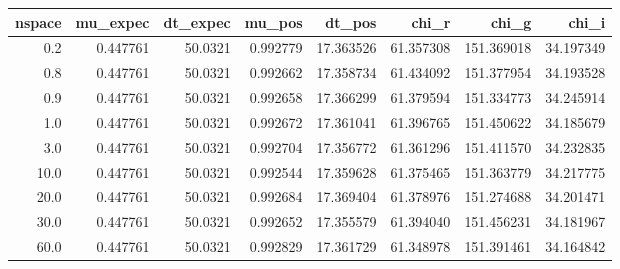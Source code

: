 \begin{tabular}{rrrrrrrr}
\toprule
 nspace &  mu\_expec &  dt\_expec &    mu\_pos &     dt\_pos &      chi\_r &       chi\_g &      chi\_i \\
\midrule
    0.2 &  0.447761 &   50.0321 &  0.992779 &  17.363526 &  61.357308 &  151.369018 &  34.197349 \\
    0.8 &  0.447761 &   50.0321 &  0.992662 &  17.358734 &  61.434092 &  151.377954 &  34.193528 \\
    0.9 &  0.447761 &   50.0321 &  0.992658 &  17.366299 &  61.379594 &  151.334773 &  34.245914 \\
    1.0 &  0.447761 &   50.0321 &  0.992672 &  17.361041 &  61.396765 &  151.450622 &  34.185679 \\
    3.0 &  0.447761 &   50.0321 &  0.992704 &  17.356772 &  61.361296 &  151.411570 &  34.232835 \\
   10.0 &  0.447761 &   50.0321 &  0.992544 &  17.359628 &  61.375465 &  151.363779 &  34.217775 \\
   20.0 &  0.447761 &   50.0321 &  0.992684 &  17.369404 &  61.378976 &  151.274688 &  34.201471 \\
   30.0 &  0.447761 &   50.0321 &  0.992652 &  17.355579 &  61.394040 &  151.456231 &  34.181967 \\
   60.0 &  0.447761 &   50.0321 &  0.992829 &  17.361729 &  61.348978 &  151.391461 &  34.164842 \\
\bottomrule
\end{tabular}
